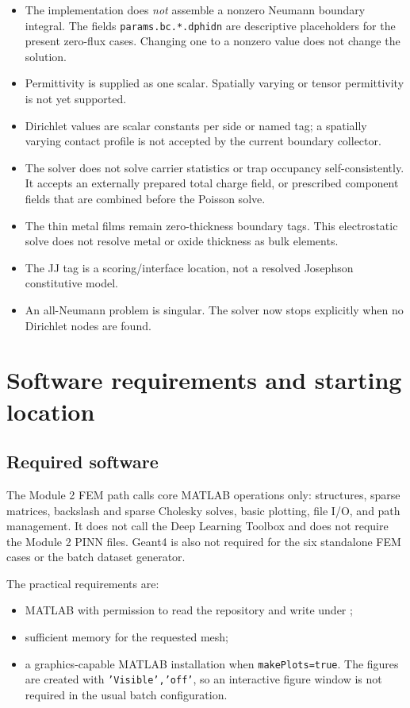 \documentclass[11pt]{article}
\newcommand{\matlabfile}[1]{\path{#1}}
\begin{document}
\begin{itemize}[leftmargin=*]
  \item The implementation does \emph{not} assemble a nonzero Neumann boundary integral. The fields \texttt{params.bc.*.dphidn} are descriptive placeholders for the present zero-flux cases. Changing one to a nonzero value does not change the solution.
  \item Permittivity is supplied as one scalar. Spatially varying or tensor permittivity is not yet supported.
  \item Dirichlet values are scalar constants per side or named tag; a spatially varying contact profile is not accepted by the current boundary collector.
  \item The solver does not solve carrier statistics or trap occupancy self-consistently. It accepts an externally prepared total charge field, or prescribed component fields that are combined before the Poisson solve.
  \item The thin metal films remain zero-thickness boundary tags. This electrostatic solve does not resolve metal or oxide thickness as bulk elements.
  \item The JJ tag is a scoring/interface location, not a resolved Josephson constitutive model.
  \item An all-Neumann problem is singular. The solver now stops explicitly when no Dirichlet nodes are found.
\end{itemize}

\section{Software requirements and starting location}

\subsection{Required software}

The Module 2 FEM path calls core MATLAB operations only: structures, sparse matrices, backslash and sparse Cholesky solves, basic plotting, file I/O, and path management. It does not call the Deep Learning Toolbox and does not require the Module 2 PINN files. Geant4 is also not required for the six standalone FEM cases or the batch dataset generator.

The practical requirements are:
\begin{itemize}[leftmargin=*]
  \item MATLAB with permission to read the repository and write under \matlabfile{matlab/outputs/};
  \item sufficient memory for the requested mesh;
  \item a graphics-capable MATLAB installation when \texttt{makePlots=true}. The figures are created with \texttt{'Visible','off'}, so an interactive figure window is not required in the usual batch configuration.
\end{itemize}
\end{document}
